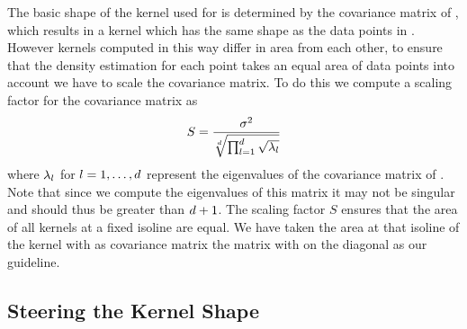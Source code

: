 	The basic shape of the kernel used for \varPattern is determined by the covariance matrix \varCovarianceMatrix of \varNeighbourhood{\KNNK}{\varPattern}, which results in a kernel which has the same shape as the data points in \varNeighbourhood{\KNNK}{\varPattern}. However kernels computed in this way differ in area from each other, to ensure that the density estimation for each point takes an equal area of data points into account  we have to scale the covariance matrix. To do this we compute a scaling factor for the covariance matrix as
	\begin{equation}
		S = \frac{\sigma^2}{\sqrt[d]{\prod_{l = 1}^{d} \sqrt{\lambda_l}}}
	\end{equation}
	 where $\lambda_l$ for $l = 1, \dotsc, d$ represent the eigenvalues of the covariance matrix of \varNeighbourhood{\KNNK}{\varPattern}. Note that since we compute the eigenvalues of  this matrix it may not be singular and \KNNK should thus be greater than $d + 1$. The scaling factor $S$ ensures that the area of all kernels at a fixed isoline are equal. We have taken the area at that isoline of the kernel with as covariance matrix the matrix with \varBandwidth on the diagonal as our guideline.
	
\subsection{Steering the Kernel Shape}


